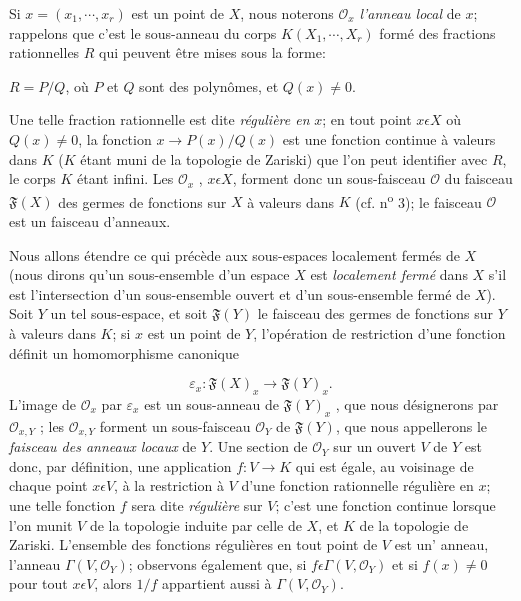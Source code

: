 Si $x = (x_1 , \cdots , x_r)$ est un point de $X$, nous noterons $\mathcal{O}_x$ \textit{l'anneau local} de $x$; rappelons que c'est le sous-anneau du corps $K(X_1 , \cdots , X_r)$ formé des fractions rationnelles $R$ qui peuvent être mises sous la forme:

$R = P/Q$, où $P$ et $Q$ sont des polynômes, et $Q(x) \neq 0$.

Une telle fraction rationnelle est dite \textit{régulière en} $x$; en tout point $x \epsilon X$ où $Q(x) \neq 0$, la fonction $x \to P(x)/Q(x)$ est une fonction continue à valeurs dans $K$ ($K$ étant muni de la topologie de Zariski) que l'on peut identifier avec $R$, le corps $K$ étant infini. Les $\mathcal{O}_x$ , $x \epsilon X$, forment donc un sous-faisceau $\mathcal{O}$ du faisceau $\mathfrak{F}(X)$ des germes de fonctions sur $X$ à valeurs dans $K$ (cf. n\textsuperscript{o} 3); le faisceau $\mathcal{O}$ est un faisceau d'anneaux.

Nous allons étendre ce qui précède aux sous-espaces localement fermés de $X$ (nous dirons qu'un sous-ensemble d'un espace $X$ est \textit{localement fermé} dans $X$ s'il est l'intersection d'un sous-ensemble ouvert et d'un sous-ensemble fermé de $X$). Soit $Y$ un tel sous-espace, et soit $\mathfrak{F}(Y)$ le faisceau des germes de fonctions sur $Y$ à valeurs dans $K$; si $x$ est un point de $Y$, l'opération de restriction d'une fonction définit un homomorphisme canonique

\begin{equation*}
\varepsilon_x : \mathfrak{F}(X)_x \longrightarrow \mathfrak{F}(Y)_x .
\end{equation*}
L'image de $\mathcal{O}_x$ par $\varepsilon_x$ est un sous-anneau de $\mathfrak{F}(Y)_x$ , que nous désignerons par $\mathcal{O}_{x,Y}$ ; les $\mathcal{O}_{x,Y}$ forment un sous-faisceau $\mathcal{O}_Y$ de $\mathfrak{F}(Y)$, que nous appellerons le \textit{faisceau des anneaux locaux} de $Y$. Une section de $\mathcal{O}_Y$ sur un ouvert $V$ de $Y$ est donc, par définition, une application $f : V \to K$ qui est égale, au voisinage de chaque point $x \epsilon V$, à la restriction à $V$ d'une fonction rationnelle régulière en $x$; une telle fonction $f$ sera dite \textit{régulière} sur $V$; c'est une fonction continue lorsque l'on munit $V$ de la topologie induite par celle de $X$, et $K$ de la topologie de Zariski. L'ensemble des fonctions régulières en tout point de $V$ est un' anneau, l'anneau $\Gamma(V, \mathcal{O}_Y)$; observons également que, si $f \epsilon \Gamma(V, \mathcal{O}_Y)$ et si $f(x) \neq 0$ pour tout $x \epsilon V$, alors $1/f$ appartient aussi à $\Gamma(V, \mathcal{O}_Y)$.


